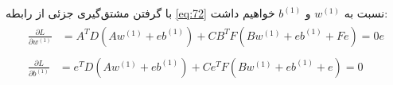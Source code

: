 با گرفتن مشتق‌گیری جزئی از رابطه \ref{eq:72} نسبت به  $w^{(1)}$ و $b^{(1)}$  خواهیم داشت:
 \begin{align}
 \label{eq:73}
 \begin{split}
 \frac{\partial L}{\partial w^{(1)}} &= {{A}^{T}}D(A{{w}^{\left(1\right)}}+e{{b}^{\left( 1 \right)}} ) + C{{B}^{T}}F(B{{w}^{\left( 1 \right)}}+e{{b}^{\left( 1 \right)}}+Fe)=0e
 \end{split}\\
 \label{eq:74}
 \begin{split}
 \frac{\partial L}{\partial b^{(1)}} &= {{e}^{T}}D(A{{w}^{\left( 1 \right)}}+e{{b}^{\left( 1 \right)}}) + C{{e}^{T}}F(B{{w}^{\left( 1 \right)}}+e{{b}^{\left( 1 \right)}}+e)=0
 \end{split}
 \end{align}
 
